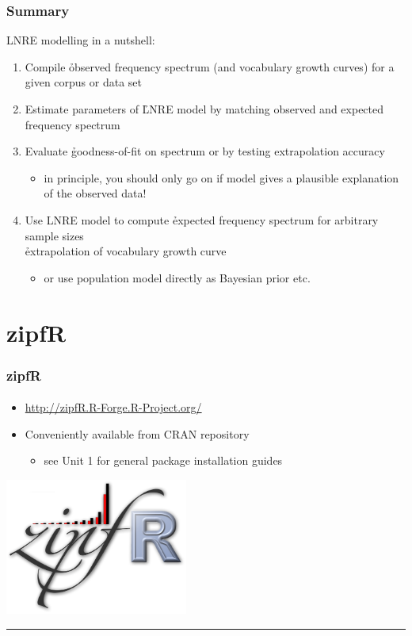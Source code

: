 \documentclass[t]{beamer} %
\begin{document}
\begin{frame}
  \frametitle{Summary}

  LNRE modelling in a nutshell:%
  \pause
  \begin{enumerate}
  \item Compile \h{observed} frequency spectrum (and vocabulary growth curves)
    for a given corpus or data set%
    \pause
  \item Estimate parameters of \h{LNRE model} by matching observed and
    expected frequency spectrum%
    \pause
  \item Evaluate \h{goodness-of-fit} on spectrum \citep{Baayen:01} or by
    testing extrapolation accuracy \citep{Baroni:Evert:07a}
    \begin{itemize}
      \item in principle, you should only go on if model gives a plausible
        explanation of the observed data!
    \end{itemize}
    \pause
  \item Use LNRE model to compute \h{expected} frequency spectrum for
    arbitrary sample sizes\\
    \so \h{extrapolation} of vocabulary growth curve
    \begin{itemize}
    \item or use population model directly as Bayesian prior etc.
    \end{itemize}
  \end{enumerate}
\end{frame}

\section{zipfR}

\begin{frame}
  \frametitle{zipfR}
  \framesubtitle{\citet{Evert:Baroni:07}}

  \begin{itemize}
  \item \url{http://zipfR.R-Forge.R-Project.org/}
  \item Conveniently available from CRAN repository
    \begin{itemize}
    \item see Unit 1 for general package installation guides
    \end{itemize}
  \end{itemize}

  \begin{flushright}
    \includegraphics[width=6cm]{img/zipfR_logo}
    \rule{1cm}{0mm}
  \end{flushright}

\end{frame}
\end{document}
